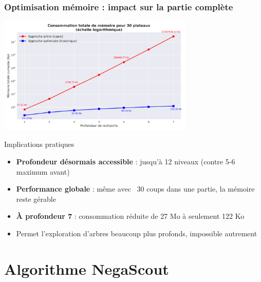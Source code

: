 \documentclass{beamer}
\begin{document}
\begin{frame}
    \frametitle{Optimisation mémoire : impact sur la partie complète}
    
    \begin{center}
        \includegraphics[width=0.7\textwidth]{../assets/memoire_totale.png}
    \end{center}
    
    \begin{block}{Implications pratiques}
    \scriptsize
    \begin{itemize}
        \item \textbf{Profondeur désormais accessible} : jusqu'à 12 niveaux (contre 5-6 maximum avant)
        \item \textbf{Performance globale} : même avec ~30 coups dans une partie, la mémoire reste gérable
        \item \textbf{À profondeur 7} : consommation réduite de 27 Mo à seulement 122 Ko
        \item Permet l'exploration d'arbres beaucoup plus profonds, impossible autrement
    \end{itemize}
    \end{block}
\end{frame}

\section{Algorithme NegaScout}
\end{document}
